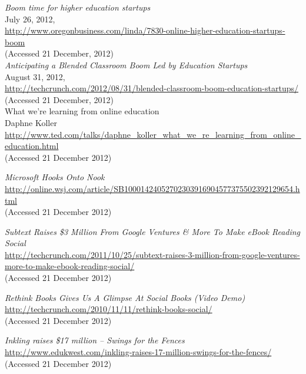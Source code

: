 \documentclass[a4paper,10pt]{book}
\begin{document}
\begin{thebibliography}{9}
  \emph{Boom time for higher education startups}\\ 
  July 26, 2012,\\
  \url{http://www.oregonbusiness.com/linda/7830-online-higher-education-startups-boom}\\
  (Accessed 21 December, 2012)\\

  \emph{Anticipating a Blended Classroom Boom Led by Education Startups}\\ 
  August 31, 2012,\\
  \url{  http://techcrunch.com/2012/08/31/blended-classroom-boom-education-startups/}\\
  (Accessed 21 December, 2012)\\

What we're learning from online education \\
Daphne Koller\\
\url{http://www.ted.com/talks/daphne_koller_what_we_re_learning_from_online_education.html}\\
  (Accessed 21 December 2012)

   \emph{Microsoft Hooks Onto Nook}\\
   \url{http://online.wsj.com/article/SB10001424052702303916904577375502392129654.html}\\
   (Accessed 21 December 2012)
   
 \emph{Subtext Raises \$3 Million From Google Ventures \& More To Make eBook Reading Social}\\
 \url{http://techcrunch.com/2011/10/25/subtext-raises-3-million-from-google-ventures-more-to-make-ebook-reading-social/}\\
   (Accessed 21 December 2012)
 
  \emph{Rethink Books Gives Us A Glimpse At Social Books (Video Demo)}\\
  \url{http://techcrunch.com/2010/11/11/rethink-books-social/}\\
  (Accessed 21 December 2012)
  
   \emph{Inkling raises \$17 million – Swings for the Fences}\\
   \url{http://www.edukwest.com/inkling-raises-17-million-swings-for-the-fences/}\\
 (Accessed 21 December 2012)
 

\end{thebibliography}
\end{document}

